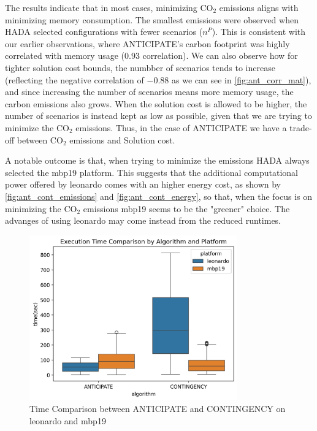 \documentclass[a4paper,singleside,12pt]{report} %
\begin{document}
The results indicate that in most cases, minimizing CO$_2$ emissions aligns with minimizing memory consumption. The smallest emissions were observed when HADA selected configurations with fewer
scenarios ($n^P$). This is consistent with our earlier observations, where ANTICIPATE's carbon footprint was highly correlated with memory usage ($0.93$ correlation). We can also observe how
for tighter solution cost bounds, the numbber of scenarios tends to increase (reflecting the negative correlation of $-0.88$ as we can see in \ref{fig:ant_corr_mat}), and since increasing the 
number of scenarios means more memory usage, the carbon emissions also grows. When the solution cost is allowed to be higher, the number of scenarios is instead kept as low as possible, given
that we are trying to minimize the CO$_2$ emissions. Thus, in the case of ANTICIPATE we have a trade-off between CO$_2$ emissions and Solution cost.

A notable outcome is that, when trying to minimize the emissions HADA always selected the mbp19 platform. This suggests that the additional computational power offered by leonardo comes with an
higher energy cost, as shown by \ref{fig:ant_cont_emissions} and \ref{fig:ant_cont_energy}, so that, when the focus is on minimizing the CO$_2$ emissions mbp19 seems to be the "greener" choice.
The advanges of using leonardo may come instead from the reduced runtimes.

\begin{figure}[h!]
    \centering
    \includegraphics[width=0.8\textwidth]{imgs/time_comparison.png}
    \caption{Time Comparison between ANTICIPATE and CONTINGENCY on leonardo and mbp19}
    \label{fig:time_comparison}
\end{figure}
\end{document}
